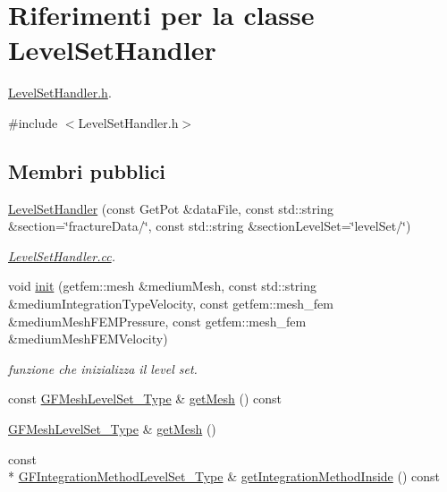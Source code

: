 \hypertarget{classLevelSetHandler}{\section{Riferimenti per la classe Level\-Set\-Handler}
\label{classLevelSetHandler}
}


\hyperlink{LevelSetHandler_8h}{Level\-Set\-Handler.\-h}.  




{\ttfamily \#include $<$Level\-Set\-Handler.\-h$>$}

\subsection*{Membri pubblici}
\begin{DoxyCompactItemize}
\item 
\hyperlink{classLevelSetHandler_a9dbe142d7d4f677abe8c204714c004ed}{Level\-Set\-Handler} (const Get\-Pot \&data\-File, const std\-::string \&section=\char`\"{}fracture\-Data/\char`\"{}, const std\-::string \&section\-Level\-Set=\char`\"{}level\-Set/\char`\"{})
\begin{DoxyCompactList}\small\item\em \hyperlink{LevelSetHandler_8cc}{Level\-Set\-Handler.\-cc}. \end{DoxyCompactList}\item 
void \hyperlink{classLevelSetHandler_a7ee7ade813923dfdef1bc25e9a881580}{init} (getfem\-::mesh \&medium\-Mesh, const std\-::string \&medium\-Integration\-Type\-Velocity, const getfem\-::mesh\-\_\-fem \&medium\-Mesh\-F\-E\-M\-Pressure, const getfem\-::mesh\-\_\-fem \&medium\-Mesh\-F\-E\-M\-Velocity)
\begin{DoxyCompactList}\small\item\em funzione che inizializza il level set. \end{DoxyCompactList}\item 
const \hyperlink{Core_8h_a126f7165f04db4ed0b72454469145a08}{G\-F\-Mesh\-Level\-Set\-\_\-\-Type} \& \hyperlink{classLevelSetHandler_a6e08147a60f9e8d7ec65357223f72311}{get\-Mesh} () const 
\item 
\hyperlink{Core_8h_a126f7165f04db4ed0b72454469145a08}{G\-F\-Mesh\-Level\-Set\-\_\-\-Type} \& \hyperlink{classLevelSetHandler_a35e4adb6d0c5128445d46f0b489ce0a2}{get\-Mesh} ()
\item 
const \\*
\hyperlink{Core_8h_ade18ba6e17965b6fdd50b3382b2a7020}{G\-F\-Integration\-Method\-Level\-Set\-\_\-\-Type} \& \hyperlink{classLevelSetHandler_a1bf7aa9bad7c2ccec178d4092690775b}{get\-Integration\-Method\-Inside} () const 

\end{DoxyCompactItemize}
